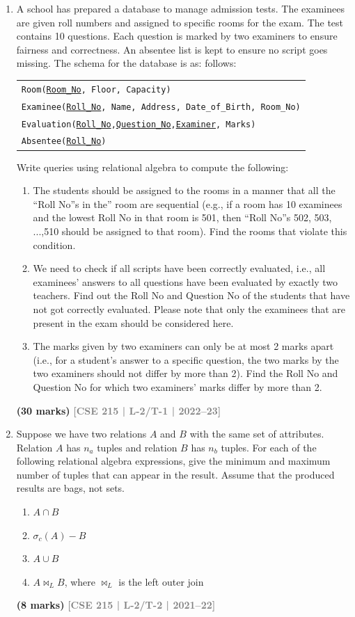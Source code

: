 \documentclass[12pt]{article}
\newcommand{\yr}[1]{\hfill\textcolor{gray}{\small\textbf{[#1]}}}
\newcommand{\mk}[1]{\textcolor{orange!70!black}{\small\textbf{(#1 marks)}}}
\begin{document}
\begin{enumerate}
\item A school has prepared a database to manage admission tests. The examinees are given
roll numbers and assigned to specific rooms for the exam. The test contains 10 questions.
Each question is marked by two examiners to ensure fairness and correctness. An
absentee list is kept to ensure no script goes missing. The schema for the database is as:
follows:
\begin{center}
\begin{tabular}{l}
\texttt{Room(\underline{Room\_No}, Floor, Capacity)}\\
\texttt{Examinee(\underline{Roll\_No}, Name, Address, Date\_of\_Birth, Room\_No)}\\
\texttt{Evaluation(\underline{Roll\_No},\underline{Question\_No},\underline{Examiner}, Marks)}\\
\texttt{Absentee(\underline{Roll\_No})}
\end{tabular}
\end{center}
Write queries using relational algebra to compute the following:
\begin{enumerate}
\item The students should be assigned to the rooms in a manner that all the “Roll No”s in the”
room are sequential (e.g., if a room has 10 examinees and the lowest Roll No in that room
is 501, then “Roll No”s 502, 503, ...,510 should be assigned to that room). Find the
rooms that violate this condition.
\item We need to check if all scripts have been correctly evaluated, i.e., all examinees'
answers to all questions have been evaluated by exactly two teachers. Find out the Roll
No and Question No of the students that have not got correctly evaluated. Please note
that only the examinees that are present in the exam should be considered here.
\item The marks given by two examiners can only be at most 2 marks apart (i.e., for a
student's answer to a specific question, the two marks by the two examiners should not
differ by more than 2). Find the Roll No and Question No for which two examiners'
marks differ by more than 2.
\end{enumerate}
\mk{30} \yr{CSE 215 | L-2/T-1 | 2022--23}


\item Suppose we have two relations $A$ and $B$ with the same set of attributes. Relation $A$ has $n_a$ tuples and relation $B$ has $n_b$ tuples. For each of the following relational algebra expressions, give the minimum and maximum number of tuples that can appear in the result. Assume that the produced results are bags, not sets.
\begin{enumerate}
  \item $A \cap B$
  \item $\sigma_c(A) - B$
  \item $A \cup B$
  \item $A \bowtie_L B$, where $\bowtie_L$ is the left outer join
\end{enumerate}
\mk{8} \yr{CSE 215 | L-2/T-2 | 2021--22}



\end{enumerate}
\end{document}

